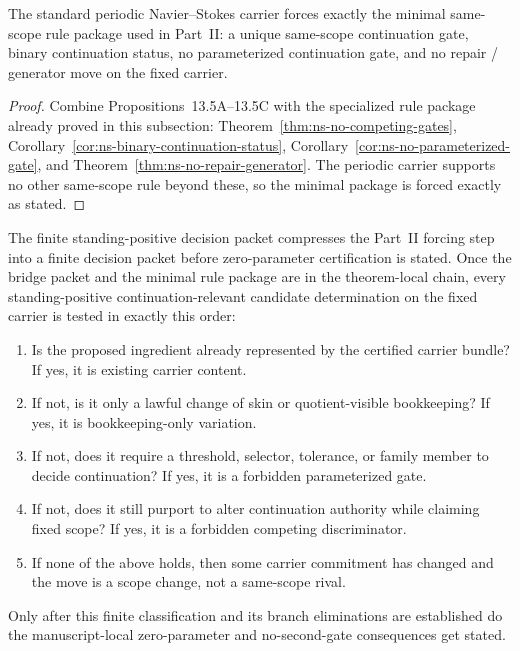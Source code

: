 \begin{manualcorollary}
\label{cor:13-5D-standard-periodic-carrier-forces-minimal-rule-package}
The standard periodic Navier--Stokes carrier forces exactly the minimal same-scope rule package used
in Part~II: a unique same-scope continuation gate, binary continuation status, no parameterized
continuation gate, and no repair / generator move on the fixed carrier.
\end{manualcorollary}

\begin{proof}
Combine Propositions~13.5A--13.5C with the specialized rule package already proved in this subsection:
Theorem~\ref{thm:ns-no-competing-gates}, Corollary~\ref{cor:ns-binary-continuation-status},
Corollary~\ref{cor:ns-no-parameterized-gate}, and
Theorem~\ref{thm:ns-no-repair-generator}.  The periodic carrier supports no other same-scope rule
beyond these, so the minimal package is forced exactly as stated.
\end{proof}

\begin{tcolorbox}[title={Finite standing-positive same-scope decision procedure on the standard periodic carrier}, colback=blue!2!white, colframe=blue!55!black]
The finite standing-positive decision packet compresses the Part~II forcing step into a finite decision packet before zero-parameter certification is stated. Once the bridge packet and the minimal rule package are in the theorem-local chain, every standing-positive continuation-relevant candidate determination on the fixed carrier is tested in exactly this order:
\begin{enumerate}[leftmargin=2.2em]
\item Is the proposed ingredient already represented by the certified carrier bundle? If yes, it is existing carrier content.
\item If not, is it only a lawful change of skin or quotient-visible bookkeeping? If yes, it is bookkeeping-only variation.
\item If not, does it require a threshold, selector, tolerance, or family member to decide continuation? If yes, it is a forbidden parameterized gate.
\item If not, does it still purport to alter continuation authority while claiming fixed scope? If yes, it is a forbidden competing discriminator.
\item If none of the above holds, then some carrier commitment has changed and the move is a scope change, not a same-scope rival.
\end{enumerate}
Only after this finite classification and its branch eliminations are established do the manuscript-local zero-parameter and no-second-gate consequences get stated.
\end{tcolorbox}

